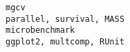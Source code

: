 \documentclass[
  letterpaper,
  DIV=11,
  numbers=noendperiod]{scrreprt}
\begin{document}
\begin{verbatim}
mgcv                                                                                                                                                                                                                                                                                                                                                                                                                                                                                                                                                                                                                                                                                                                                                                                                                                                                                                                                                                                                                                                                                                                                                                                                                                                                                 parallel, survival, MASS
microbenchmark                                                                                                                                                                                                                                                                                                                                                                                                                                                                                                                                                                                                                                                                                                                                                                                                                                                                                                                                                                                                                                                                                                                                                                                                                                                                       ggplot2, multcomp, RUnit

\end{verbatim}
\end{document}
